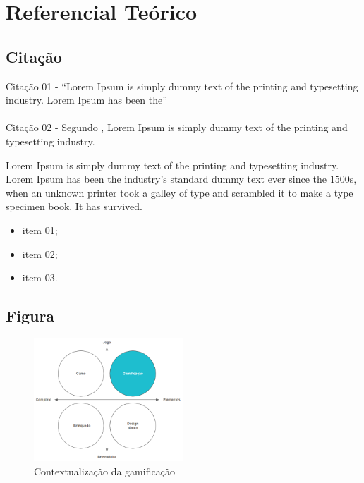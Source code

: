 
\chapter[Referencial Teórico]{Referencial Teórico}


\section{Citação}

Citação 01 - ``Lorem Ipsum is simply dummy text of the printing and typesetting industry. Lorem Ipsum has been the'' \cite{AEB:20} \\\\
Citação 02 - Segundo , Lorem Ipsum is simply dummy text of the printing and typesetting industry.\\

\begin{citacao}
   Lorem Ipsum is simply dummy text of the printing and typesetting industry. Lorem Ipsum has been the industry's standard dummy text ever since the 1500s, when an unknown printer took a galley of type and scrambled it to make a type specimen book. It has survived. \cite{Sagan:19}
\end{citacao}

\begin{itemize}
    \item item 01;
    \item item 02;
    \item item 03.
\end{itemize}


\section{Figura}

\begin{figure}[ht]
    \caption{Contextualização da gamificação}
    \label{fig:game}
    \centering
    \includegraphics[width=0.5\textwidth]{figuras/Gamificação.png}
\end{figure}


